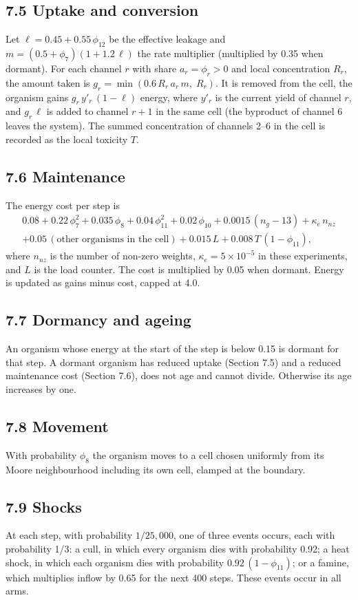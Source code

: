 \subsection*{7.5 Uptake and conversion}
Let $\ell = 0.45 + 0.55\,\phi_{12}$ be the effective leakage and
$m = (0.5+\phi_7)(1+1.2\,\ell)$ the rate multiplier (multiplied by 0.35 when
dormant). For each channel $r$ with share $a_r=\phi_r>0$ and local concentration
$R_r$, the amount taken is $g_r=\min(0.6\,R_r\,a_r\,m,\;R_r)$. It is removed from
the cell, the organism gains $g_r\,y'_r\,(1-\ell)$ energy, where $y'_r$ is the
current yield of channel $r$, and $g_r\,\ell$ is added to channel $r+1$ in the same
cell (the byproduct of channel 6 leaves the system). The summed concentration of
channels 2--6 in the cell is recorded as the local toxicity $T$.

\subsection*{7.6 Maintenance}
The energy cost per step is
\begin{multline*}
0.08 + 0.22\,\phi_7^2 + 0.035\,\phi_8 + 0.04\,\phi_{11}^2 + 0.02\,\phi_{10}
+ 0.0015\,(n_g-13) + \kappa_e\, n_{nz}\\
+ 0.05\,(\text{other organisms in the cell}) + 0.015\,L
+ 0.008\,T\,(1-\phi_{11}),
\end{multline*}
where $n_{nz}$ is the number of non-zero weights, $\kappa_e = 5\times10^{-5}$ in
these experiments, and $L$ is the load counter. The cost is multiplied by 0.05
when dormant. Energy is updated as gains minus cost, capped at 4.0.

\subsection*{7.7 Dormancy and ageing}
An organism whose energy at the start of the step is below 0.15 is dormant for that step. A dormant organism has reduced uptake (Section 7.5) and a reduced maintenance cost (Section 7.6), does not age and cannot divide. Otherwise its age increases
by one.

\subsection*{7.8 Movement}
With probability $\phi_8$ the organism moves to a cell chosen uniformly from its
Moore neighbourhood including its own cell, clamped at the boundary.

\subsection*{7.9 Shocks}
At each step, with probability $1/25{,}000$, one of three events occurs, each with
probability 1/3: a cull, in which every organism dies with probability 0.92; a
heat shock, in which each organism dies with probability $0.92\,(1-\phi_{11})$;
or a famine, which multiplies inflow by 0.65 for the next 400 steps. These events
occur in all arms.

